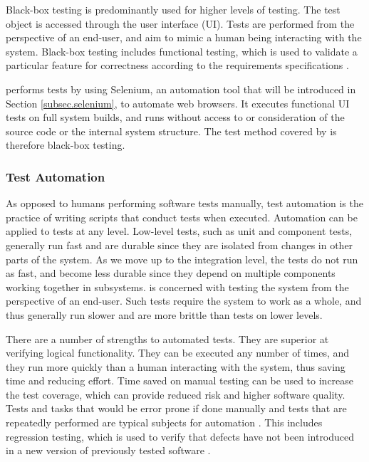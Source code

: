 Black-box testing is predominantly used for higher levels of testing. The test object is accessed through the user interface (UI). Tests are performed from the perspective of an end-user, and aim to mimic a human being interacting with the system. Black-box testing includes functional testing, which is used to validate a particular feature for correctness according to the requirements specifications \cite{SoftwareTestingFoundations}.

\toolname \space performs tests by using Selenium, an automation tool that will be introduced in Section \ref{subsec.selenium}, to automate web browsers. It executes functional UI tests on full system builds, and runs without access to or consideration of the source code or the internal system structure. The test method covered by \toolname \space is therefore black-box testing.




\subsubsection{Test Automation}
As opposed to humans performing software tests manually, test automation is the practice of writing scripts that conduct tests when executed. Automation can be applied to tests at any level. Low-level tests, such as unit and component tests, generally run fast and are durable since they are isolated from changes in other parts of the system. As we move up to the integration level, the tests do not run as fast, and become less durable since they depend on multiple components working together in subsystems. \toolname \space is concerned with testing the system from the perspective of an end-user. Such tests require the system to work as a whole, and thus generally run slower and are more brittle \cite{pluralsight_endtoend} than tests on lower levels.


There are a number of strengths to automated tests. They are superior at verifying logical functionality. They can be executed any number of times, and they run more quickly than a human interacting with the system, thus saving time and reducing effort. Time saved on manual testing can be used to increase the test coverage, which can provide reduced risk and higher software quality. Tests and tasks that would be error prone if done manually and tests that are repeatedly performed are typical subjects for automation \cite{ASTvol3}. This includes regression testing, which is used to verify that defects have not been introduced in a new version of previously tested software \cite{SoftwareTestingFoundations}.

